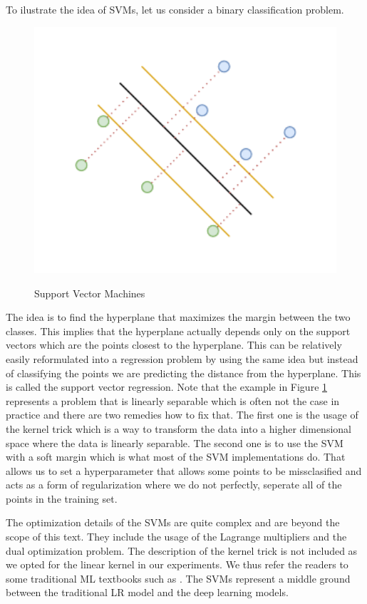 To ilustrate the idea of \ac{SVM}s, let us consider a binary classification problem.

\begin{figure}[!h]
    \centering
    \caption{Support Vector Machines}
        \includegraphics[width=1\textwidth]{Figures/SVM_idea.drawio.pdf}
    \label{fig:svm}
\end{figure}


The idea is to find the hyperplane that maximizes the margin between the two classes.
This implies that the hyperplane actually depends only on the support vectors which are the points
closest to the hyperplane. This can be relatively easily reformulated
into a regression problem by using the same idea but instead of classifying the points
we are predicting the distance from the hyperplane. This is called the support vector regression.
Note that the example in Figure \ref{fig:svm} represents a problem that is linearly separable
which is often not the case in practice and there are two remedies how to fix that.
The first one is the usage of the kernel trick which is a way to transform the data into a higher dimensional space
where the data is linearly separable. The second one is to use the \ac{SVM} with a soft margin which is
what most of the \ac{SVM} implementations do. That allows us to set a hyperparameter that allows
some points to be missclasified and acts as a form of regularization where we do not perfectly,
seperate all of the points in the training set. 


The optimization details of the \ac{SVM}s are quite complex and are beyond the scope of this text.
They include the usage of the Lagrange multipliers and the dual optimization problem. The description
of the kernel trick is not included as we opted for the linear kernel in our experiments.
We thus refer the readers to some traditional \ac{ML} textbooks such as \cite{bishop2006pattern}.
The \ac{SVM}s represent a middle ground between the traditional \ac{LR} model and the deep learning models.


